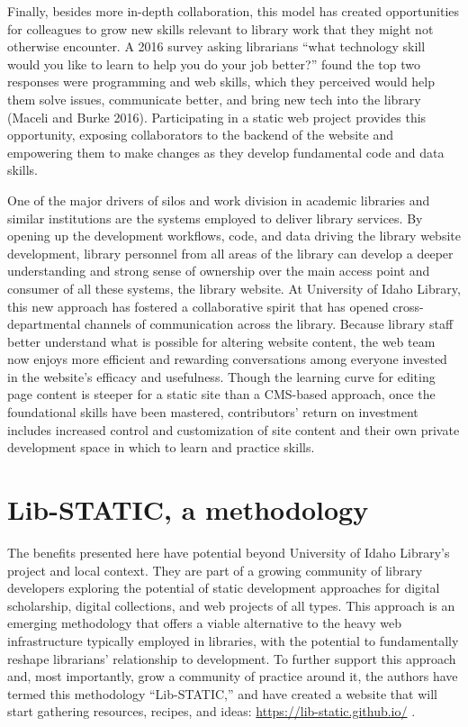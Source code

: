 \documentclass{book}
\begin{document}
Finally, besides more in-depth collaboration, this model has created
opportunities for colleagues to grow new skills relevant to library work that
they might not otherwise encounter. A 2016 survey asking librarians ``what
technology skill would you like to learn to help you do your job better?''
found the top two responses were programming and web skills, which they
perceived would help them solve issues, communicate better, and bring new tech
into the library (Maceli and Burke 2016). Participating in a static web
project provides this opportunity, exposing collaborators to the backend of
the website and empowering them to make changes as they develop fundamental
code and data skills.

One of the major drivers of silos and work division in academic libraries and
similar institutions are the systems employed to deliver library services. By
opening up the development workflows, code, and data driving the library
website development, library personnel from all areas of the library can
develop a deeper understanding and strong sense of ownership over the main
access point and consumer of all these systems, the library website. At
University of Idaho Library, this new approach has fostered a collaborative
spirit that has opened cross-departmental channels of communication across the
library. Because library staff better understand what is possible for altering
website content, the web team now enjoys more efficient and rewarding
conversations among everyone invested in the website's efficacy and
usefulness. Though the learning curve for editing page content is steeper for
a static site than a CMS-based approach, once the foundational skills have
been mastered, contributors' return on investment includes increased control
and customization of site content and their own private development space in
which to learn and practice skills.

\hypertarget{lib-static-a-methodology}{%
\section{Lib-STATIC, a methodology}\label{lib-static-a-methodology}}

The benefits presented here have potential beyond University of Idaho
Library's project and local context. They are part of a growing community of
library developers exploring the potential of static development approaches
for digital scholarship, digital collections, and web projects of all types.
This approach is an emerging methodology that offers a viable alternative to
the heavy web infrastructure typically employed in libraries, with the
potential to fundamentally reshape librarians' relationship to development. To
further support this approach and, most importantly, grow a community of
practice around it, the authors have termed this methodology ``Lib-STATIC,''
and have created a website that will start gathering resources, recipes, and
ideas: \url{https://lib-static.github.io/} .
\end{document}
